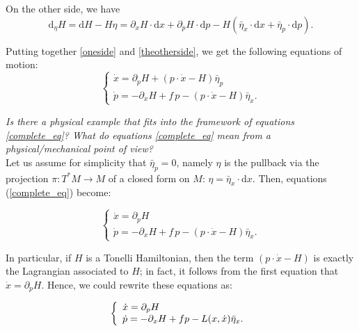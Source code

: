 \documentclass[11pt]{article}
\theoremstyle{definition}
\def\d{\mathrm{d}}
\begin{document}
\noindent On the other side, we have
\begin{equation}\label{theotherside}
\d_\eta H =\d H - H\eta = \partial_x H \cdot \d x + \partial_p H \cdot \d p - H(\bar{\eta}_x \cdot \d x + \bar{\eta}_p \cdot \d p). 
\end{equation}

Putting together \eqref{oneside} and \eqref{theotherside}, we get the following {equations of motion}:
\begin{equation}
  \label{complete_eq}
  \left\{
  \begin{array}{l}
    \dot{x} = \partial_p H + (p\cdot \dot{x} -H) \bar{\eta}_p
    \\
     \dot{p} = -\partial_x H + f \,p - (p\cdot \dot{x} -H) \bar{\eta}_x.
  \end{array}
  \right.
\end{equation}

\bigskip
\bigskip

 {\it Is there a physical example that fits into the framework of equations \eqref{complete_eq}? What do equations \eqref{complete_eq} mean from a physical/mechanical point of view? }\\


\noindent Let us assume for simplicity that $\bar{\eta}_p=0$, namely $\eta$ is the pullback via the projection $\pi:T^*M\longrightarrow M$ of a closed form on $M$: $\eta = \bar{\eta}_x \cdot \d x.$ Then, equations (\ref{complete_eq}) become:

\begin{equation}
  \label{ham_eq}
  \left\{
  \begin{array}{l}
    \dot{x} = \partial_p H 
    \\
     \dot{p} = -\partial_x H + f \,p - (p\cdot \dot{x} -H) \bar{\eta}_x.
  \end{array}
  \right.
\end{equation}


\noindent In particular, if $H$ is a Tonelli Hamiltonian, then the term $(p\cdot \dot{x} -H)$ is exactly the Lagrangian associated to $H$; in fact, it follows from the first equation that
$\dot{x} = \partial_p H$. Hence, we could rewrite these equations as:

\begin{equation}
  \label{ham_eq2}
  \left\{
  \begin{array}{l}
    \dot{x} = \partial_p H 
    \\
     \dot{p} = -\partial_x H + f p - L(x,\dot{x}) \bar{\eta}_x.
  \end{array}
  \right.\\
\end{equation}
\end{document}
